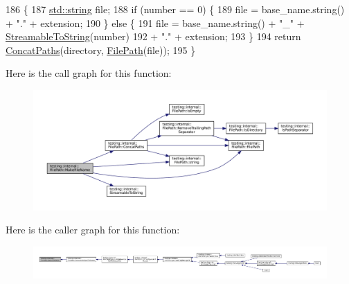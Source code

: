 \begin{DoxyCode}
186                                                        \{
187   \hyperlink{namespacetesting_1_1internal_a8e8ff5b11e64078831112677156cb111}{std::string} file;
188   \textcolor{keywordflow}{if} (number == 0) \{
189     file = base\_name.string() + \textcolor{stringliteral}{"."} + extension;
190   \} \textcolor{keywordflow}{else} \{
191     file = base\_name.string() + \textcolor{stringliteral}{"\_"} + \hyperlink{namespacetesting_1_1internal_aad4beed95d0846e6ffc5da0978ef3bb9}{StreamableToString}(number)
192         + \textcolor{stringliteral}{"."} + extension;
193   \}
194   \textcolor{keywordflow}{return} \hyperlink{classtesting_1_1internal_1_1FilePath_ac9d57987f60ac43f0c57b89e333e531e}{ConcatPaths}(directory, \hyperlink{classtesting_1_1internal_1_1FilePath_a3504a51accbca78a52fe586133ea5499}{FilePath}(file));
195 \}
\end{DoxyCode}
Here is the call graph for this function\+:
\nopagebreak
\begin{figure}[H]
\begin{center}
\leavevmode
\includegraphics[width=350pt]{classtesting_1_1internal_1_1FilePath_aa8c102da670261eb4fa8e2f2481df139_cgraph}
\end{center}
\end{figure}
Here is the caller graph for this function\+:
\nopagebreak
\begin{figure}[H]
\begin{center}
\leavevmode
\includegraphics[width=350pt]{classtesting_1_1internal_1_1FilePath_aa8c102da670261eb4fa8e2f2481df139_icgraph}
\end{center}
\end{figure}
\mbox{\label{classtesting_1_1internal_1_1FilePath_aa2f6d7d7823f71f25de50d309c966ef7}} 
